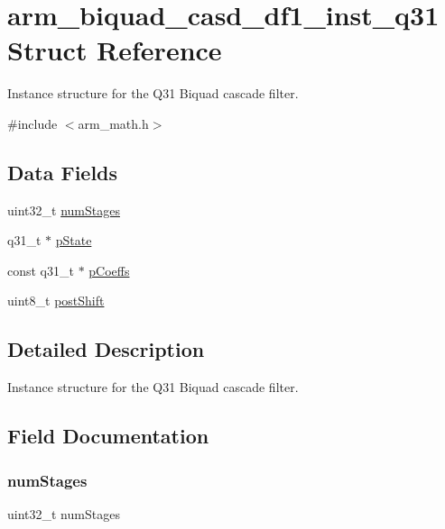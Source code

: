 \hypertarget{structarm__biquad__casd__df1__inst__q31}{}\section{arm\+\_\+biquad\+\_\+casd\+\_\+df1\+\_\+inst\+\_\+q31 Struct Reference}
\label{structarm__biquad__casd__df1__inst__q31}


Instance structure for the Q31 Biquad cascade filter.  




{\ttfamily \#include $<$arm\+\_\+math.\+h$>$}

\subsection*{Data Fields}
\begin{DoxyCompactItemize}
\item 
uint32\+\_\+t \mbox{\hyperlink{structarm__biquad__casd__df1__inst__q31_aed9c8a6224cd149e8e12b17b25b9b767}{num\+Stages}}
\item 
q31\+\_\+t $\ast$ \mbox{\hyperlink{structarm__biquad__casd__df1__inst__q31_adee4ba3ee8869865af7d8fa08ca913d6}{p\+State}}
\item 
const q31\+\_\+t $\ast$ \mbox{\hyperlink{structarm__biquad__casd__df1__inst__q31_a80e7fdf4747dbda8eadb2663fb4be317}{p\+Coeffs}}
\item 
uint8\+\_\+t \mbox{\hyperlink{structarm__biquad__casd__df1__inst__q31_a74050e9f36542bd56f4052381a82ae8f}{post\+Shift}}
\end{DoxyCompactItemize}


\subsection{Detailed Description}
Instance structure for the Q31 Biquad cascade filter. 

\subsection{Field Documentation}
\mbox{\label{structarm__biquad__casd__df1__inst__q31_aed9c8a6224cd149e8e12b17b25b9b767}} 
\subsubsection{\texorpdfstring{numStages}{numStages}}
{\footnotesize\ttfamily uint32\+\_\+t num\+Stages}

